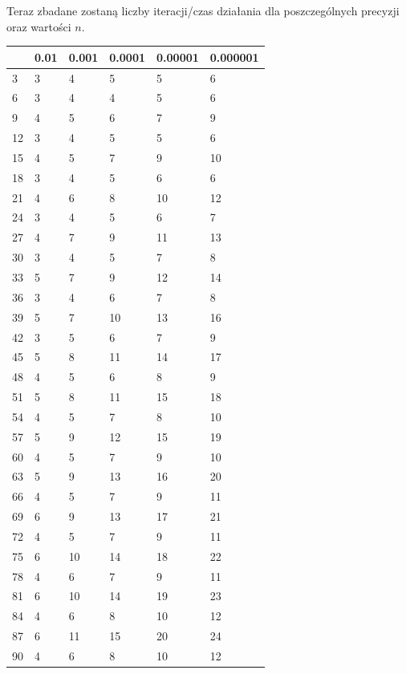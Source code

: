 \documentclass{article}
\begin{document}
Teraz zbadane zostaną liczby iteracji/czas działania dla poszczególnych precyzji oraz wartości $n$.

\begin{table}[H]
\centering
\begin{tabular}{|l|l|l|l|l|l|}
\hline
& 0.01 & 0.001 & 0.0001 & 0.00001 & 0.000001 \\ \hline
3 & 3 & 4 & 5 & 5 & 6 \\ \hline
6 & 3 & 4 & 4 & 5 & 6 \\ \hline
9 & 4 & 5 & 6 & 7 & 9 \\ \hline
12 & 3 & 4 & 5 & 5 & 6 \\ \hline
15 & 4 & 5 & 7 & 9 & 10 \\ \hline
18 & 3 & 4 & 5 & 6 & 6 \\ \hline
21 & 4 & 6 & 8 & 10 & 12 \\ \hline
24 & 3 & 4 & 5 & 6 & 7 \\ \hline
27 & 4 & 7 & 9 & 11 & 13 \\ \hline
30 & 3 & 4 & 5 & 7 & 8 \\ \hline
33 & 5 & 7 & 9 & 12 & 14 \\ \hline
36 & 3 & 4 & 6 & 7 & 8 \\ \hline
39 & 5 & 7 & 10 & 13 & 16 \\ \hline
42 & 3 & 5 & 6 & 7 & 9 \\ \hline
45 & 5 & 8 & 11 & 14 & 17 \\ \hline
48 & 4 & 5 & 6 & 8 & 9 \\ \hline
51 & 5 & 8 & 11 & 15 & 18 \\ \hline
54 & 4 & 5 & 7 & 8 & 10 \\ \hline
57 & 5 & 9 & 12 & 15 & 19 \\ \hline
60 & 4 & 5 & 7 & 9 & 10 \\ \hline
63 & 5 & 9 & 13 & 16 & 20 \\ \hline
66 & 4 & 5 & 7 & 9 & 11 \\ \hline
69 & 6 & 9 & 13 & 17 & 21 \\ \hline
72 & 4 & 5 & 7 & 9 & 11 \\ \hline
75 & 6 & 10 & 14 & 18 & 22 \\ \hline
78 & 4 & 6 & 7 & 9 & 11 \\ \hline
81 & 6 & 10 & 14 & 19 & 23 \\ \hline
84 & 4 & 6 & 8 & 10 & 12 \\ \hline
87 & 6 & 11 & 15 & 20 & 24 \\ \hline
90 & 4 & 6 & 8 & 10 & 12 \\ \hline

\end{tabular}
\end{table}
\end{document}
